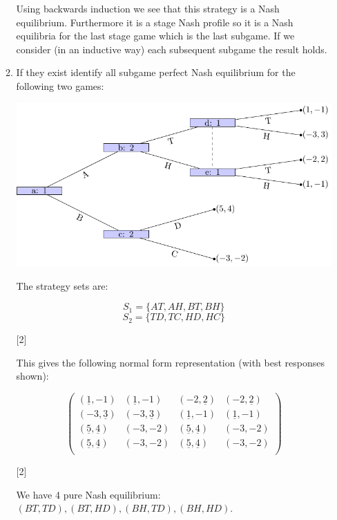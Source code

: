 \documentclass[12pt,a4paper]{article}
\begin{document}
\begin{enumerate}
\begin{enumerate}
            Using backwards induction we see that this strategy is a Nash equilibrium. Furthermore it is a stage Nash profile so it is a Nash equilibria for the last stage game which is the last subgame. If we consider (in an inductive way) each subsequent subgame the result holds.

            \item If they exist identify all subgame perfect Nash equilibrium for the following two games:

                \begin{center}
                    \includegraphics[width=.8\textwidth]{images/mock-img02.pdf}\\
                \end{center}

                The strategy sets are:

                \[S_1=\{AT,AH,BT,BH\}\]
                \[S_2=\{TD,TC,HD,HC\}\]

                \hfill[2]

                This gives the following normal form representation (with best responses shown):

                \[\begin{pmatrix}
                (\underline{1},-1)&(\underline{1},-1)&(-2,\underline{2})&(-2,\underline{2})\\
                (-3,\underline{3})&(-3,\underline{3})&(\underline{1},-1)&(\underline{1},-1)\\
                (\underline{5},\underline{4})&(-3,-2)&(\underline{5},\underline{4})&(-3,-2)\\
                (\underline{5},\underline{4})&(-3,-2)&(\underline{5},\underline{4})&(-3,-2)\\
                \end{pmatrix}\]

                \hfill[2]

                We have 4 pure Nash equilibrium: \((BT,TD),(BT,HD),(BH,TD),(BH,HD)\).


\end{enumerate}
\end{enumerate}
\end{document}
